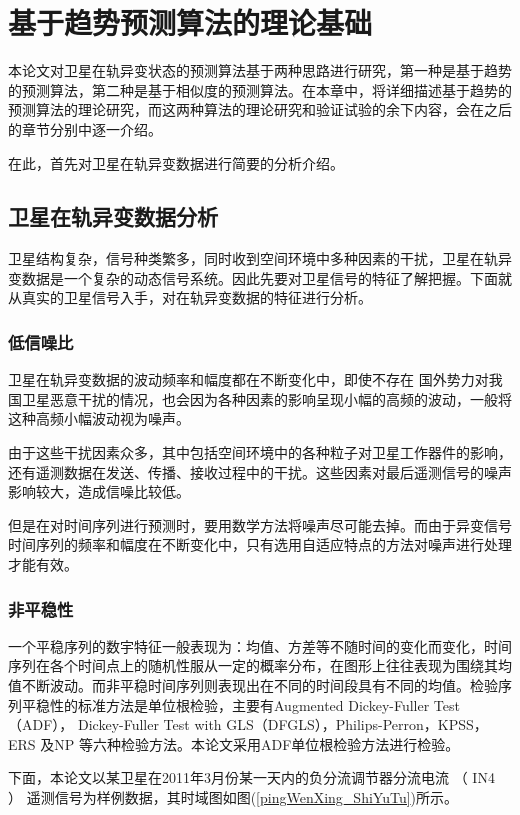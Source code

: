 
\chapter{基于趋势预测算法的理论基础}{\label{chap:topot}}
本论文对卫星在轨异变状态的预测算法基于两种思路进行研究，第一种是基于趋势的预测算法，第二种是基于相似度的预测算法。在本章中，将详细描述基于趋势的预测算法的理论研究，而这两种算法的理论研究和验证试验的余下内容，会在之后的章节分别中逐一介绍。

在此，首先对卫星在轨异变数据进行简要的分析介绍。
\section{卫星在轨异变数据分析} 
卫星结构复杂，信号种类繁多，同时收到空间环境中多种因素的干扰，卫星在轨异变数据是一个复杂的动态信号系统。因此先要对卫星信号的特征了解把握。下面就从真实的卫星信号入手，对在轨异变数据的特征进行分析。

\subsection{低信噪比}
卫星在轨异变数据的波动频率和幅度都在不断变化中，即使不存在 国外势力对我国卫星恶意干扰的情况，也会因为各种因素的影响呈现小幅的高频的波动，一般将这种高频小幅波动视为噪声。

由于这些干扰因素众多，其中包括空间环境中的各种粒子对卫星工作器件的影响，还有遥测数据在发送、传播、接收过程中的干扰。这些因素对最后遥测信号的噪声影响较大，造成信噪比较低。

但是在对时间序列进行预测时，要用数学方法将噪声尽可能去掉。而由于异变信号时间序列的频率和幅度在不断变化中，只有选用自适应特点的方法对噪声进行处理才能有效。

\subsection{非平稳性}
一个平稳序列的数宇特征一般表现为：均值、方差等不随时间的变化而变化，时间序列在各个时间点上的随机性服从一定的概率分布，在图形上往往表现为围绕其均值不断波动。而非平稳时间序列则表现出在不同的时间段具有不同的均值。检验序列平稳性的标准方法是单位根检验，主要有Augmented Dickey-Fuller Test（ADF）， Dickey-Fuller Test with GLS（DFGLS），Philips-Perron，KPSS，ERS 及NP 等六种检验方法。本论文采用ADF单位根检验方法进行检验。

下面，本论文以某卫星在2011年3月份某一天内的负分流调节器分流电流 （ IN4 ） 遥测信号为样例数据，其时域图如图(\ref{pingWenXing_ShiYuTu})所示。

